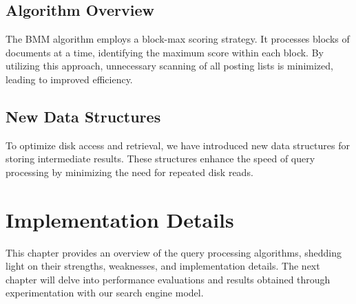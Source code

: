 \subsection{Algorithm Overview}

The BMM algorithm employs a block-max scoring strategy. It processes blocks of documents at a time, identifying the maximum 
score within each block. By utilizing this approach, unnecessary scanning of all posting lists is minimized, leading to 
improved efficiency.

\subsection{New Data Structures}

To optimize disk access and retrieval, we have introduced new data structures for storing intermediate results. These 
structures enhance the speed of query processing by minimizing the need for repeated disk reads.

\section{Implementation Details}


This chapter provides an overview of the query processing algorithms, shedding light on their strengths, weaknesses, and 
implementation details. The next chapter will delve into performance evaluations and results obtained through experimentation 
with our search engine model.
